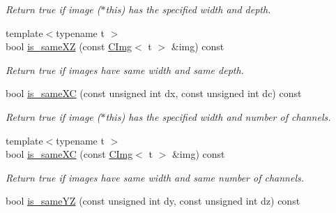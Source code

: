 \begin{DoxyCompactItemize}
\begin{DoxyCompactList}\small\item\em Return {\ttfamily true} if image ($\ast$this) has the specified width and depth. \item\end{DoxyCompactList}\item 
\hypertarget{structcimg__library_1_1CImg_ab1c89e89bd61546d5b0a98040c37356e}{
{\footnotesize template$<$typename t $>$ }\\bool \hyperlink{structcimg__library_1_1CImg_ab1c89e89bd61546d5b0a98040c37356e}{is\_\-sameXZ} (const \hyperlink{structcimg__library_1_1CImg}{CImg}$<$ t $>$ \&img) const }
\label{structcimg__library_1_1CImg_ab1c89e89bd61546d5b0a98040c37356e}

\begin{DoxyCompactList}\small\item\em Return {\ttfamily true} if images have same width and same depth. \item\end{DoxyCompactList}\item 
\hypertarget{structcimg__library_1_1CImg_a0023c97fc2276234355731e53a4f440b}{
bool \hyperlink{structcimg__library_1_1CImg_a0023c97fc2276234355731e53a4f440b}{is\_\-sameXC} (const unsigned int dx, const unsigned int dc) const }
\label{structcimg__library_1_1CImg_a0023c97fc2276234355731e53a4f440b}

\begin{DoxyCompactList}\small\item\em Return {\ttfamily true} if image ($\ast$this) has the specified width and number of channels. \item\end{DoxyCompactList}\item 
\hypertarget{structcimg__library_1_1CImg_a65a2c91e672f559e7217b1ca8bc82f21}{
{\footnotesize template$<$typename t $>$ }\\bool \hyperlink{structcimg__library_1_1CImg_a65a2c91e672f559e7217b1ca8bc82f21}{is\_\-sameXC} (const \hyperlink{structcimg__library_1_1CImg}{CImg}$<$ t $>$ \&img) const }
\label{structcimg__library_1_1CImg_a65a2c91e672f559e7217b1ca8bc82f21}

\begin{DoxyCompactList}\small\item\em Return {\ttfamily true} if images have same width and same number of channels. \item\end{DoxyCompactList}\item 
\hypertarget{structcimg__library_1_1CImg_a229ee758d966e13dc65cc853b5bc2566}{
bool \hyperlink{structcimg__library_1_1CImg_a229ee758d966e13dc65cc853b5bc2566}{is\_\-sameYZ} (const unsigned int dy, const unsigned int dz) const }
\label{structcimg__library_1_1CImg_a229ee758d966e13dc65cc853b5bc2566}


\end{DoxyCompactItemize}
